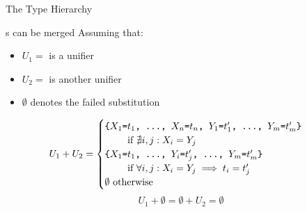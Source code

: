 \documentclass[handout]{beamer}
\begin{document}
\begin{frame}[allowframebreaks]{The  Type Hierarchy}
    \begin{alertblock}{s can be merged}
        Assuming that:
        \begin{itemize}
            \item $U_1 = $  is a unifier
            \item $U_2 = $  is another unifier
            \item $\emptyset$ denotes the failed substitution
        \end{itemize}
        \[U_1 + U_2 = \begin{cases}
            \text{\texttt{\{$X_1$=$t_1$, \ldots, $X_n$=$t_n$, $Y_1$=$t'_1$, \ldots, $Y_m$=$t'_m$\}}} \\
            \qquad\text{ if } \nexists i,j : X_i = Y_j \\
            \text{\texttt{\{$X_1$=$t_1$, \ldots, $Y_i$=$t'_j$, \ldots, $Y_m$=$t'_m$\}}} \\
            \qquad\text{ if } \forall i,j : X_i = Y_j \implies t_i = t'_j\\
            \emptyset \text{ otherwise }
        \end{cases}\]
        \[ U_1 + \emptyset = \emptyset + U_2 = \emptyset \]
    \end{alertblock}


\end{frame}
\end{document}

